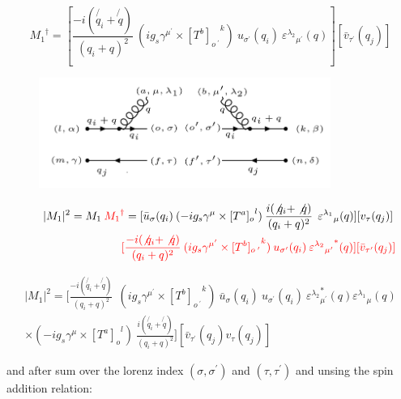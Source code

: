 \begin{equation}
{M_1}^{\dagger} = [\frac{-i(\not{q_i} + \not{q})}{(q_i + q)^2} \:  (ig_s \gamma^{{\mu}^{\prime}}\times {[T^b]_{o\:^{\prime}}}^k) \: u_{{\sigma}^{\prime}}(q_i) \: {\varepsilon^{\lambda_2}}_{{\mu}^{\prime}} (q)][{\bar{v}}_{{\tau}^{\prime}}(q_j)]
\end{equation}
\pagebreak
\begin{figure}[h!]
\centering
\includegraphics[width=0.85\textwidth]{images/qgqbarMSquer.png}
\end{figure}

\begin{equation}
\begin{split}
|M_1|^2=M_1\:{\color[RGB]{255,0,0} {M_1}^{\dagger}} = [{\bar{u}}_{\sigma}(q_i)\: (-ig_s \gamma^{\mu}\times {[T^a]_o}^l) \: \frac{i(\not{q_i} + \not{q})}{(q_i + q)^2}\:\: {\varepsilon^{\lambda_1}}_{\mu} (q)] [{v}_{\tau}(q_j)]\: \\
\quad\quad\quad\quad\quad\quad\quad\quad\:\:{\color[RGB]{255,0,0}[\frac{-i(\not{q_i} + \not{q})}{(q_i + q)^2} \:  (ig_s \gamma^{{\mu}^{\prime}}\times {[T^b]_{o\:^{\prime}}}^k) \: u_{{\sigma}^{\prime}}(q_i) \: {{\varepsilon^{\lambda_2}}_{{\mu}^{\prime}}}^* (q)][{\bar{v}}_{{\tau}^{\prime}}(q_j)]}
\end{split}
\end{equation}


\begin{equation}
\begin{split}
|M_1|^2=[\frac{-i(\not{q_i} + \not{q})}{(q_i + q)^2} \:
 \:  (ig_s \gamma^{{\mu}^{\prime}}\times {[T^b]_{o\:^{\prime}}}^k) \: {\bar{u}}_{\sigma}(q_i)\:u_{{\sigma}^{\prime}}(q_i) \: {{\varepsilon^{\lambda_2}}_{{\mu}^{\prime}}^* (q) {\varepsilon^{\lambda_1}}_{\mu} (q)} \\
\times (-ig_s \gamma^{\mu}\times {[T^a]_o}^l) \: \frac{i(\not{q_i} + \not{q})}{(q_i + q)^2} ]
[{\bar{v}}_{{\tau}^{\prime}}(q_j) {v}_{\tau}(q_j)]
\end{split}
\end{equation}

and after sum over the lorenz index $({\sigma},{\sigma}^{\prime})$ and $({\tau},{\tau}^{\prime})$ and unsing the spin addition relation:
 
